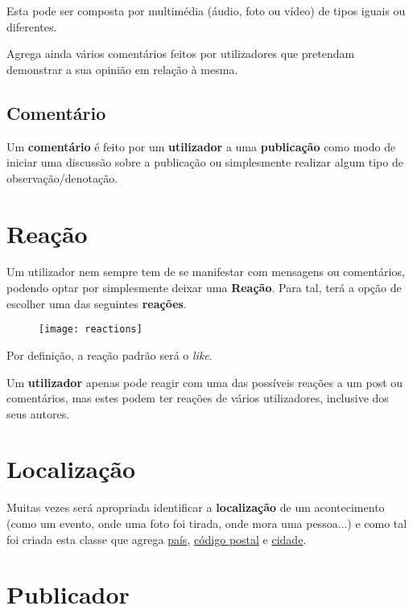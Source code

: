 \documentclass{report}
\begin{document}
Esta pode ser composta por multimédia (áudio, foto ou vídeo) de tipos iguais ou diferentes. \par

Agrega ainda vários comentários feitos por utilizadores que pretendam demonstrar a sua opinião em relação à mesma. \par

\subsection{Comentário}

Um \textbf{comentário} é feito por um \textbf{utilizador} a uma \textbf{publicação} como modo de iniciar uma discussão sobre a publicação ou simplesmente realizar algum tipo de observação/denotação. \par

\section{Reação}

Um utilizador nem sempre tem de se manifestar com mensagens ou comentários, podendo optar por simplesmente deixar uma \textbf{Reação}. Para tal, terá a opção de escolher uma das seguintes \textbf{reações}.

\begin{figure}[h!]
    \centering
    \texttt{[image: reactions]}
\end{figure}

Por definição, a reação padrão será o \textit{like}. \par

Um \textbf{utilizador} apenas pode reagir com uma das possíveis reações a um post ou comentários, mas estes podem ter reações de vários utilizadores, inclusive dos seus autores.

\section{Localização}

Muitas vezes será apropriada identificar a \textbf{localização} de um acontecimento (como um evento, onde uma foto foi tirada, onde mora uma pessoa...) e como tal foi criada esta classe que agrega \underline{país}, \underline{código postal} e \underline{cidade}.

\section{Publicador}
\end{document}
